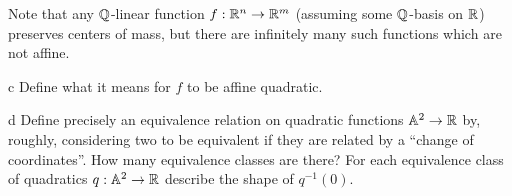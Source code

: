 \documentclass{../../templates/lkx_pset}
\begin{document}
\begin{parts}
  Note that any $\mathbb{Q}$-linear function $f : \mathbb{R}^n \to \mathbb{R}^m$ (assuming some $\mathbb{Q}$-basis on $\mathbb{R}$) preserves centers of mass, but there are infinitely many such functions which are not affine.

  \begin{part}{c}
    Define what it means for $f$ to be affine quadratic.
  \end{part}

  \begin{part}{d}
    Define precisely an equivalence relation on quadratic functions $\mathbb{A}^2 \to \mathbb{R}$ by, roughly, considering two to be equivalent if they are related by a ``change of coordinates''. How many equivalence classes are there? For each equivalence class of quadratics $q : \mathbb{A}^2 \to \mathbb{R}$ describe the shape of $q^{-1}(0)$.
  \end{part}
\end{parts}

\begin{problem}{5}
\end{problem}
\end{document}
